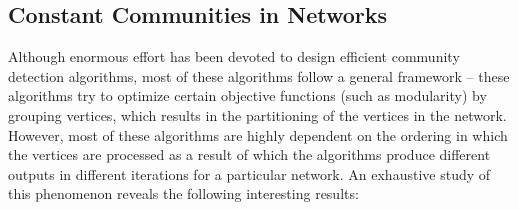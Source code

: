 \subsection{Constant Communities in Networks}
Although enormous effort has been devoted to design efficient community detection algorithms, most of these algorithms
follow a general framework -- these
algorithms try to optimize certain objective functions (such as modularity) by grouping vertices, which results in the partitioning of the
vertices in the network. However, most of these algorithms are highly dependent on the ordering in which the vertices are processed as a
result of which the algorithms produce different outputs in different iterations for a particular network. An exhaustive study of this
phenomenon reveals the following interesting results:

